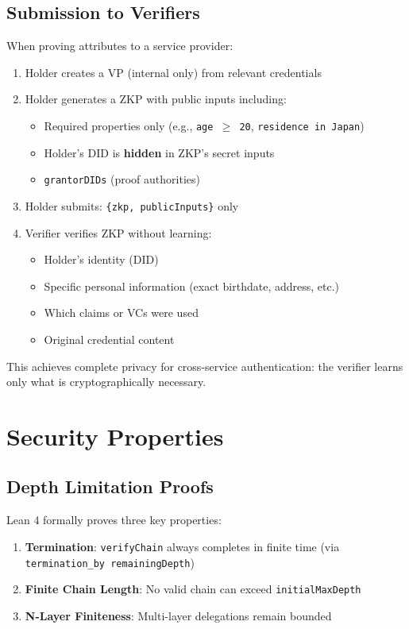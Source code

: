 \subsection{Submission to Verifiers}

When proving attributes to a service provider:

\begin{enumerate}
  \item Holder creates a VP (internal only) from relevant credentials
  \item Holder generates a ZKP with public inputs including:
    \begin{itemize}
      \item Required properties only (e.g., \texttt{age $\geq$ 20}, \texttt{residence in Japan})
      \item Holder's DID is \textbf{hidden} in ZKP's secret inputs
      \item \texttt{grantorDIDs} (proof authorities)
    \end{itemize}
  \item Holder submits: \texttt{\{zkp, publicInputs\}} only
  \item Verifier verifies ZKP without learning:
    \begin{itemize}
      \item Holder's identity (DID)
      \item Specific personal information (exact birthdate, address, etc.)
      \item Which claims or VCs were used
      \item Original credential content
    \end{itemize}
\end{enumerate}

This achieves complete privacy for cross-service authentication: the verifier learns only what is cryptographically necessary.

\section{Security Properties}

\subsection{Depth Limitation Proofs}

Lean 4 formally proves three key properties:

\begin{enumerate}
  \item \textbf{Termination}: \texttt{verifyChain} always completes in finite time (via \texttt{termination\_by remainingDepth})
  \item \textbf{Finite Chain Length}: No valid chain can exceed \texttt{initialMaxDepth}
  \item \textbf{N-Layer Finiteness}: Multi-layer delegations remain bounded
\end{enumerate}

